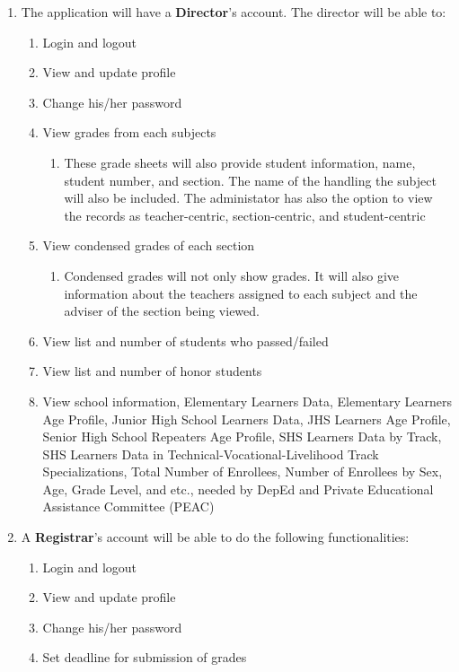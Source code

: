 \documentclass[11pt,a4paper,titlepage]{article}
\begin{document}
\begin{enumerate}
	\item The application will have a \textbf{Director}'s account. The director will be able to:
	\begin{enumerate}
		\item Login and logout
		\item View and update profile
		\item Change his/her password
		\item View grades from each subjects
        \begin{enumerate}
            \item These grade sheets will also provide student information, name, student number, and section. The name of the handling the subject will also be included. The administator has also the option to view the records as teacher-centric, section-centric, and student-centric
        \end{enumerate}
        \item View condensed grades of each section
        \begin{enumerate}
            \item Condensed grades will not only show grades. It will also give information about the teachers assigned to each subject and the adviser of the section being viewed.
        \end{enumerate}
        \item View list and number of students who passed/failed
        \item View list and number of honor students
        \item View school information, Elementary Learners Data, Elementary Learners Age Profile, Junior High School Learners Data, JHS Learners Age Profile, Senior High School Repeaters Age Profile, SHS Learners Data by Track, SHS Learners Data in Technical-Vocational-Livelihood Track Specializations, Total Number of Enrollees, Number of Enrollees by Sex, Age, Grade Level, and etc., needed by DepEd and Private Educational Assistance Committee (PEAC)
    \end{enumerate}
    \item A \textbf{Registrar}'s account will be able to do the following functionalities:
    \begin{enumerate}
        \item Login and logout
        \item View and update profile
        \item Change his/her password
        \item Set deadline for submission of grades

\end{enumerate}
\end{enumerate}
\end{document}
